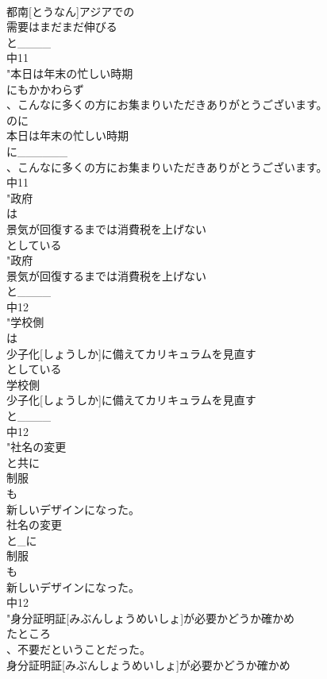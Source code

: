 \documentclass[8pt]{extreport}
\begin{document}
\begin{CJK}{UTF8}{min}
\\	都南[とうなん]アジアでの
\\	需要はまだまだ伸びる
\\	と____
\\	中11
\\	"本日は年末の忙しい時期
\\	にもかかわらず
\\	、こんなに多くの方にお集まりいただきありがとうございます。
\\	のに	
\\	本日は年末の忙しい時期
\\	に______
\\	、こんなに多くの方にお集まりいただきありがとうございます。
\\	中11
\\	"政府
\\	は
\\	景気が回復するまでは消費税を上げない
\\	としている
\\	"政府
\\	景気が回復するまでは消費税を上げない
\\	と____
\\	中12
\\	"学校側
\\	は
\\	少子化[しょうしか]に備えてカリキュラムを見直す
\\	としている
\\	学校側
\\	少子化[しょうしか]に備えてカリキュラムを見直す
\\	と____
\\	中12
\\	"社名の変更
\\	と共に
\\	制服
\\	も
\\	新しいデザインになった。
\\	社名の変更
\\	と_に
\\	制服
\\	も
\\	新しいデザインになった。
\\	中12
\\	"身分証明証[みぶんしょうめいしょ]が必要かどうか確かめ
\\	たところ
\\	、不要だということだった。
\\	身分証明証[みぶんしょうめいしょ]が必要かどうか確かめ

\end{CJK}
\end{document}

